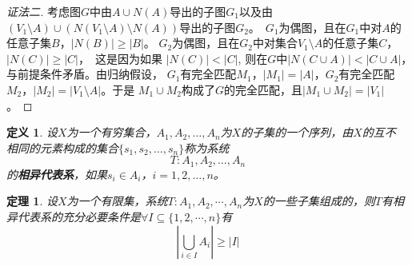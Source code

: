 \documentclass{book}[oneside]
\newtheorem{Def}{定义}[chapter]
\newtheorem{Thm}{定理}[chapter]
\begin{document}
\begin{CJK*}{UTF8}{gbsn}
\begin{proof}[证法二]
考虑图$G$中由$A \cup N(A)$导出的子图$G_1$以及由$(V_1\setminus A) \cup
(N(V_1\setminus A)\setminus N(A))$导出的子图$G_2$。　$G_1$为偶图，且在$G_1$中对$A$的任意子集$B$，$|N(B)| \geq |B|$。
$G_2$为偶图，且在$G_2$中对集合$V_1\setminus A$的任意子集$C$，　$|N(C)| \geq |C|$，　这是因为如果
$|N(C)| < |C|$, 则在$G$中$|N(C \cup A)| < |C \cup A|$，　与前提条件矛盾。由归纳假设，
$G_1$有完全匹配$M_1$，$|M_1|=|A|$，$G_2$有完全匹配$M_2$，$|M_2|=|V_1\setminus A|$。于是
$M_1\cup M_2$构成了$G$的完全匹配，且$|M_1\cup M_2| = |V_1|$。
  \end{proof}
    \begin{Def}
    设$X$为一个有穷集合，$A_1,A_2,\ldots,A_n$为$X$的子集的一个序列，由$X$的互不
    相同的元素构成的集合$\{s_1,s_2,\ldots,s_n\}$称为系统\[T:A_1,A_2,\ldots,A_n\]的{\bfseries 相异代表系}，如果$s_i\in A_i$，$i=1,2,\ldots,n$。
  \end{Def}
  \begin{Thm}
    设$X$为一个有限集，系统$T:A_1,A_2,\cdots,A_n$为$X$的一些子集组成的，则$T$有相异代表系的充分必要条件是$\forall I \subseteq \{1,2,\cdots, n\}$有
    \[|\bigcup_{i\in I}A_i|\geq |I|\]
  \end{Thm}



\chapter{}

\end{CJK*}
\end{document}
